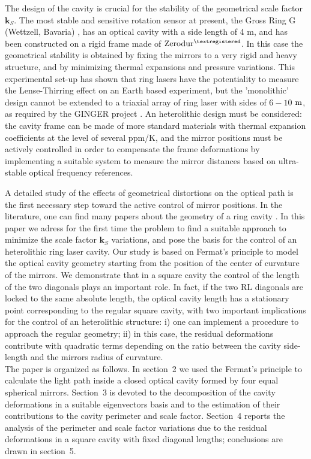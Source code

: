 \documentclass[12pt,a4paper,final]{iopart}
\begin{document}
The design of the cavity is crucial for the stability of the geometrical scale factor $\mathbf{k}_{S}$. The most stable and sensitive rotation sensor
at present, the Gross Ring G (Wettzell, Bavaria) \cite{GWettzell}, has an 
optical cavity with a side length of 4 m, and has been constructed on a rigid frame made of $\rm Zerodur^{\textregistered}$. In this case the geometrical stability is obtained by fixing the mirrors to a very rigid and heavy structure, and by minimizing thermal expansions and pressure variations. This experimental set-up has shown that ring lasers have the potentiality to measure the Lense-Thirring effect on an Earth based experiment, but the 'monolithic' design  cannot be extended to a triaxial array of ring laser with sides of  $6-10$ $\rm{m}$, as required by the GINGER project \cite{PRD2011}. An heterolithic design must be considered: the cavity frame can be made of more standard materials with thermal expansion coefficients at the level of several  \rm{ppm/K}, and the mirror positions
must be actively controlled in order to compensate the frame deformations by implementing a suitable system to measure the mirror distances 
based on ultra-stable optical frequency references. 

 A detailed study of the effects of geometrical distortions on the
optical path is the first necessary step toward the active control of mirror positions. 
In the literature, one can find many papers about the geometry of a ring cavity \cite{Cinesi1,Cinesi2,Cinesi3,Hurst-Geometry,Stedman,Bilger,Rodloff}.
In this paper we adress for the first time the problem to find a suitable approach to minimize the scale factor $\textbf{k}_{S}$ variations, and pose the basis for the control of an heterolithic ring laser cavity. Our study is based on  Fermat's principle to model the optical cavity geometry 
starting from the position of the center of curvature of the mirrors. 
We demonstrate that in a square cavity the control of the length of the two diagonals plays an important role. In fact, if the two RL diagonals are locked to the same absolute length, the optical cavity length has a stationary point corresponding to the regular square cavity, with two important implications for  the control of an heterolithic structure: i) one can implement a procedure to approach the regular geometry; ii) in this case, the residual deformations  contribute with quadratic terms depending on the ratio between the cavity side-length and the mirrors radius of curvature. 
\\
The paper is organized as follows. In section~2 we used the Fermat's
principle to calculate the light path inside a closed optical cavity formed
by four equal spherical mirrors. Section~3 is devoted to the decomposition of the 
cavity deformations in a suitable eigenvectors basis and to the estimation of their contributions 
to the cavity perimeter and scale factor. 
Section~4 reports the analysis of the perimeter and scale factor variations 
due to the residual deformations in a square cavity with fixed diagonal lengths; 
conclusions are drawn in section~5.
\end{document}
